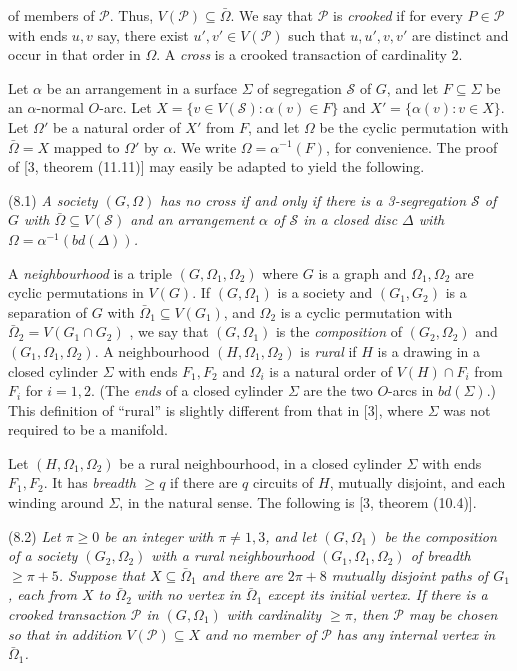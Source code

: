 \noindent of members of $\mathscr{P}$. Thus, $V(\mathscr{P}) \subseteq \bar{\Omega}$. We say that $\mathscr{P}$ is \textit{crooked} if for every $P \in \mathscr{P}$ with ends $u, v$ say, there exist $u', v' \in V(\mathscr{P})$ such that $u, u', v, v'$ are distinct and occur in that order in $\Omega$. A \textit{cross} is a crooked transaction of cardinality 2.

Let $\alpha$ be an arrangement in a surface $\Sigma$ of segregation $\mathscr{S}$ of $G$, and let $F \subseteq \Sigma$ be an $\alpha$-normal $O$-arc. Let $X = \{v \in V(\mathscr{S}) : \alpha(v) \in F\}$ and $X' = \{\alpha(v) : v \in X\}$. Let $\Omega'$ be a natural order of $X'$ from $F$, and let $\Omega$ be the cyclic permutation with $\bar{\Omega} = X$ mapped to $\Omega'$ by $\alpha$. We write $\Omega = \alpha^{-1}(F)$, for convenience. The proof of [3, theorem (11.11)] may easily be adapted to yield the following.

\stmt
(8.1) \textit{A society $(G, \Omega)$ has no cross if and only if there is a 3-segregation $\mathscr{S}$ of $G$ with $\bar{\Omega} \subseteq V(\mathscr{S})$ and an arrangement $\alpha$ of $\mathscr{S}$ in a closed disc $\Delta$ with $\Omega = \alpha^{-1}(bd(\Delta))$.}

A \textit{neighbourhood} is a triple $(G, \Omega_1, \Omega_2)$ where $G$ is a graph and $\Omega_1, \Omega_2$ are cyclic permutations in $V(G)$. If $(G, \Omega_1)$ is a society and $(G_1, G_2)$ is a separation of $G$ with $\bar{\Omega}_1 \subseteq V(G_1)$, and $\Omega_2$ is a cyclic permutation with $\bar{\Omega}_2 = V(G_1 \cap G_2)$ , we say that $(G, \Omega_1)$ is the \textit{composition} of $(G_2, \Omega_2)$ and $(G_1, \Omega_1, \Omega_2)$. A neighbourhood $(H, \Omega_1, \Omega_2)$ is \textit{rural} if $H$ is a drawing in a closed cylinder $\Sigma$ with ends $F_1, F_2$ and $\Omega_i$ is a natural order of $V(H) \cap F_i$ from $F_i$ for $i = 1, 2$. (The \textit{ends} of a closed cylinder $\Sigma$ are the two $O$-arcs in $bd(\Sigma)$.) This definition of ``rural'' is slightly different from that in [3], where $\Sigma$ was not required to be a manifold.

Let $(H, \Omega_1, \Omega_2)$ be a rural neighbourhood, in a closed cylinder $\Sigma$ with ends $F_1, F_2$. It has \textit{breadth} $\ge q$ if there are $q$ circuits of $H$, mutually disjoint, and each winding around $\Sigma$, in the natural sense. The following is [3, theorem (10.4)].

\stmt
(8.2) \textit{Let $\pi \ge 0$ be an integer with $\pi \ne 1, 3$, and let $(G, \Omega_1)$ be the composition of a society $(G_2, \Omega_2)$ with a rural neighbourhood $(G_1, \Omega_1, \Omega_2)$ of breadth $\ge \pi + 5$. Suppose that $X \subseteq \bar{\Omega}_1$ and there are $2\pi + 8$ mutually disjoint paths of $G_1$, each from $X$ to $\bar{\Omega}_2$ with no vertex in $\bar{\Omega}_1$ except its initial vertex. If there is a crooked transaction $\mathscr{P}$ in $(G, \Omega_1)$ with cardinality $\ge \pi$, then $\mathscr{P}$ may be chosen so that in addition $V(\mathscr{P}) \subseteq X$ and no member of $\mathscr{P}$ has any internal vertex in $\bar{\Omega}_1$.}

